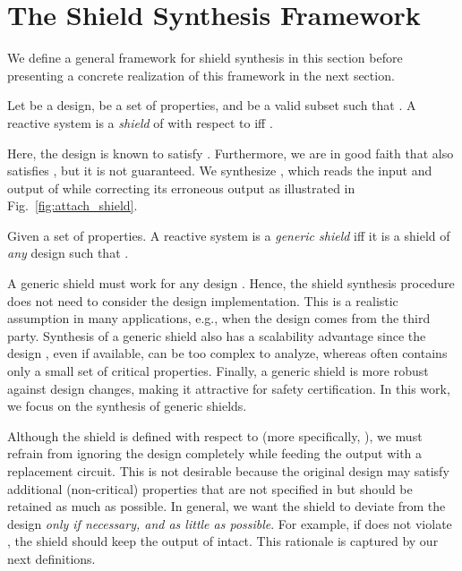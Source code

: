 \documentclass{llncs}
\begin{document}
\section{The Shield Synthesis Framework} 
\label{sec:frame}

We define a general framework for shield synthesis in this section 
before presenting a concrete realization of this framework in the next 
section.

\begin{definition}[Shield]
Let  
be a design,  be a set of properties, and  
be a valid subset such that .  A reactive system 
 is 
a \emph{shield} of  with respect to  
iff .
\end{definition}

\noindent
Here, the design is known to satisfy . 
Furthermore, we are in good faith that  also satisfies , but it is not guaranteed.  We synthesize , 
which reads the input and output of  while correcting its 
erroneous output as illustrated in Fig.~\ref{fig:attach_shield}.

\begin{definition}
Given a set  of properties.  
A reactive system  is a \emph{generic shield} iff it is a 
shield of \emph{any} design  such that .
\end{definition}

\noindent
A generic shield must work for any design . 
Hence, the shield synthesis procedure does not need to consider the 
design implementation.  This is a realistic assumption in many 
applications, e.g., when the design  comes from the third 
party.  Synthesis of a generic shield also has a scalability advantage 
since the design , even if available, can be too complex to 
analyze, whereas  often contains only a small set of critical
properties.  Finally, a generic shield is more robust against design 
changes, making it attractive for safety certification.  In this work, 
we focus on the synthesis of generic shields.

Although the shield is defined with respect to  (more 
specifically, ), we must refrain from ignoring the 
design completely while feeding the output with a replacement circuit.  
This is not desirable because the original design may satisfy additional 
(non-critical) properties that are not specified in  but should 
be retained as much as possible.  In general, we want the shield to 
deviate from the design \emph{only if necessary, and as little as 
possible}.  For example, if  does not violate , the 
shield  should keep the output of  intact.  This 
rationale is captured by our next definitions.
\end{document}

